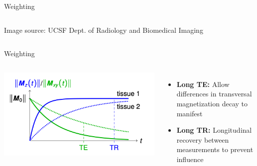 \begin{frame}{\longtime{} Weighting}
\begin{columns}[t,onlytextwidth]
        {\scriptsize Image source: UCSF Dept. of Radiology and Biomedical Imaging}
    \end{columns}
\end{frame}

\begin{frame}{\transtime{} Weighting}

    \begin{columns}[t,onlytextwidth]
        \includegraphics[height=0.6\textheight]{images/weighting_t2}

        \begin{itemize}
            \item \textbf{Long TE:} Allow differences in transversal magnetization decay to manifest
            \item \textbf{Long TR:} Longitudinal recovery between measurements to prevent \longtime{} influence
        \end{itemize}


\end{columns}
\end{frame}
